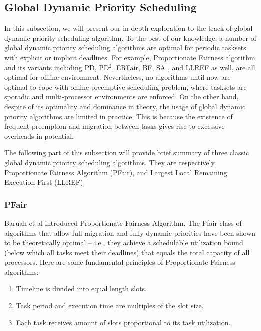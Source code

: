 \documentclass[preprint,12pt]{elsarticle}
\begin{document}
\subsection{Global Dynamic Priority Scheduling}
In this subsection, we will present our in-depth exploration to the track of
global dynamic priority scheduling algorithm. To the best of our knowledge, a
number of global dynamic priority scheduling algorithms are optimal for
periodic tasksets with explicit or implicit deadlines.
For example, Proportionate Fairness algorithm and its variants including PD,
PD$^2$, ERFair, BF, SA \cite{khemka1997optimal}, and LLREF
\cite{cho2006optimal} as well, are all optimal for offline environment.
Nevertheless, no algorithms until now are optimal to cope with online
preemptive scheduling problem, where tasksets are sporadic and multi-processor
environments are enforced.
On the other hand, despite of its optimality and dominance in theory, the
usage of global dynamic priority algorithms are limited in practice. This is
because the existence of frequent preemption and migration between tasks gives
rise to excessive overheads in potential. 

The following part of this subsection will provide brief summary of three
classic global dynamic priority scheduling algorithms. They are respectively 
Proportionate Fairness Algorithm (PFair), and Largest Local Remaining Execution
First (LLREF). 

\subsubsection{PFair}
Baruah et al \cite{baruah1996proportionate} introduced Proportionate Fairness
Algorithm. 
The Pfair class of algorithms that allow full migration and fully dynamic
priorities have been shown to be theoretically optimal -- i.e., they achieve a
schedulable utilization bound (below which all tasks meet their deadlines)
that equals the total capacity of all processors. Here are some fundamental
principles of Proportionate Fairness algorithms: 

\begin{enumerate}
    \item Timeline is divided into equal length slots. 
    \item Task period and execution time are multiples of the slot size. 
    \item Each task receives amount of slots proportional to its task
        utilization. 
\end{enumerate}
\end{document}
